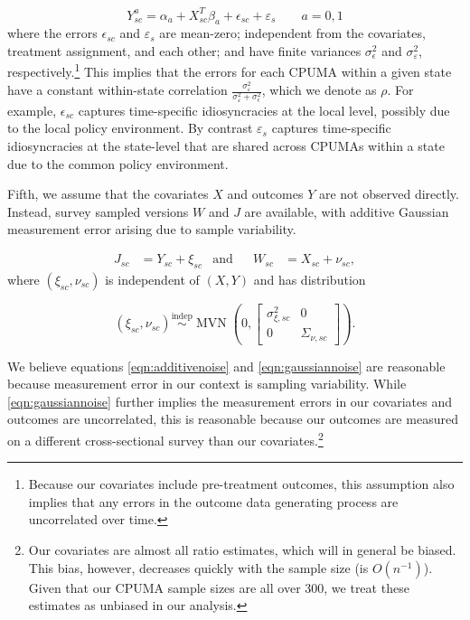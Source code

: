 \documentclass[aoas]{imsart}
\theoremstyle{plain}
\theoremstyle{remark}
\begin{document}
\begin{equation}\label{eqn:linmod}
Y_{sc}^a = \alpha_a + X_{sc}^T\beta_a + \epsilon_{sc} + \varepsilon_s \qquad a = 0, 1
\end{equation}
where the errors $\epsilon_{sc}$ and $\varepsilon_{s}$ are mean-zero; independent from the covariates, treatment assignment, and each other; and have finite variances $\sigma^2_{\epsilon}$ and $\sigma^2_{\varepsilon}$, respectively.\footnote{Because our covariates include pre-treatment outcomes, this assumption also implies that any errors in the outcome data generating process are uncorrelated over time.} This implies that the errors for each CPUMA within a given state have a constant within-state correlation $\frac{\sigma^2_{\varepsilon}}{\sigma^2_{\varepsilon} + \sigma^2_{\epsilon}}$, which we denote as $\rho$. For example, $\epsilon_{sc}$ captures time-specific idiosyncracies at the local level, possibly due to the local policy environment. By contrast $\varepsilon_s$ captures time-specific idiosyncracies at the state-level that are shared across CPUMAs within a state due to the common policy environment.

Fifth, we assume that the covariates $X$ and outcomes $Y$ are not observed directly. Instead, survey sampled versions $W$ and $J$ are available, with additive Gaussian measurement error arising due to sample variability.

\begin{align} \label{eqn:additivenoise}
	J_{sc} & = Y_{sc} + \xi_{sc} & \text{and} & & W_{sc} & = X_{sc} + \nu_{sc},
\end{align}
where $(\xi_{sc}, \nu_{sc})$ is independent of $(X, Y)$ and has distribution

\begin{equation} \label{eqn:gaussiannoise}
 (\xi_{sc}, \nu_{sc}) \stackrel{\text{indep}}{\sim} \operatorname{MVN}\left(0, \left[\begin{array}{cc} \sigma_{\xi,sc}^2 & 0 \\ 0 & \Sigma_{\nu, sc} \end{array}\right] \right).
\end{equation}

We believe equations \eqref{eqn:additivenoise} and \eqref{eqn:gaussiannoise} are reasonable because measurement error in our context is sampling variability. While \eqref{eqn:gaussiannoise} further implies the measurement errors in our covariates and outcomes are uncorrelated, this is reasonable because our outcomes are measured on a different cross-sectional survey than our covariates.\footnote{Our covariates are almost all ratio estimates, which will in general be biased. This bias, however, decreases quickly with the sample size (is $O(n^{-1})$). Given that our CPUMA sample sizes are all over 300, we treat these estimates as unbiased in our analysis.} 
\end{document}
